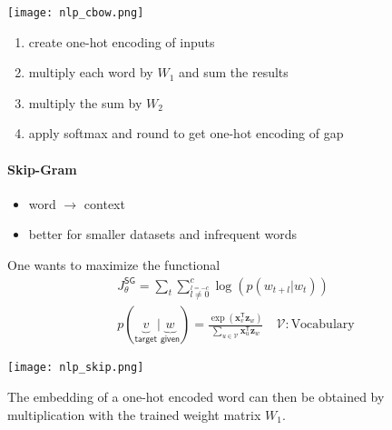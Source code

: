 \newpar{}
\begin{center}
    \texttt{[image: nlp\_cbow.png]}
\end{center}
\begin{enumerate}
    \item create one-hot encoding of inputs
    \item multiply each word by $W_1$ and sum the results
    \item multiply the sum by $W_2$
    \item apply softmax and round to get one-hot encoding of gap
\end{enumerate}

\paragraph{Skip-Gram}
\begin{itemize}
    \item word $\to$ context
    \item better for smaller datasets and infrequent words
\end{itemize}

One wants to maximize the functional
\noindent\begin{gather*}
    J_{\theta}^{\mathsf{SG}} = \sum_{t}\sum_{\overset{l=-c}{l\neq 0}}^{c} \log(p(w_{t+l}|w_t))\\
    p(\underbrace{v}_{\textsf{target}} | \underbrace{w}_{\textsf{given}})  = \frac{\exp(\mathbf{x}_v^{\mathsf{T}}\mathbf{z}_w)}{\sum\limits_{u\in \mathcal{V}} \mathbf{x}_u^{\mathsf{T}}\mathbf{z}_w} \quad \mathcal{V}: \text{Vocabulary}
\end{gather*}

\newpar{}
\begin{center}
    \texttt{[image: nlp\_skip.png]}
\end{center}
The embedding of a one-hot encoded word can then be obtained by multiplication with the trained weight matrix $W_1$.

